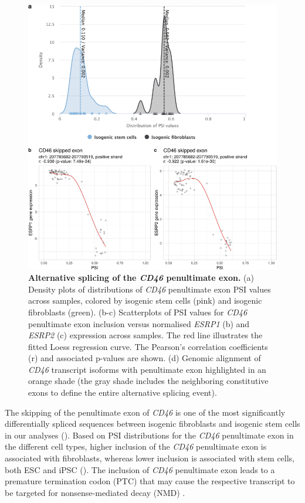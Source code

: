 \begin{figure}[!b]
  \includegraphics[width=.8\textwidth]{images/psichomics/7-cd46-as}
  \centering
  \caption[Alternative splicing of the \emph{CD46} penultimate exon]{\textbf{Alternative splicing of the \emph{CD46} penultimate exon.} (a) Density plots of distributions of \emph{CD46} penultimate exon PSI values across samples, colored by isogenic stem cells (pink) and isogenic fibroblasts (green). (b-c) Scatterplots of PSI values for \emph{CD46} penultimate exon inclusion versus normalised \emph{ESRP1} (b) and \emph{ESRP2} (c) expression across samples. The red line illustrates the fitted Loess regression curve. The Pearson’s correlation coefficients (r) and associated p-values are shown. (d) Genomic alignment of \emph{CD46} transcript isoforms with penultimate exon highlighted in an orange shade (the gray shade includes the neighboring constitutive exons to define the entire alternative splicing event).}
  \label{fig:psichomics-cd46-as}
\end{figure}

The skipping of the penultimate exon of \emph{CD46} is one of the most significantly differentially spliced sequences between isogenic fibroblasts and isogenic stem cells in our analyses (). Based on PSI distributions for the \emph{CD46} penultimate exon in the different cell types, higher inclusion of the \emph{CD46} penultimate exon is associated with fibroblasts, whereas lower inclusion is associated with stem cells, both ESC and iPSC (). The inclusion of \emph{CD46} penultimate exon leads to a premature termination codon (PTC) that may cause the respective transcript to be targeted for nonsense-mediated decay (NMD) \cite{warzecha:2010wi}.

